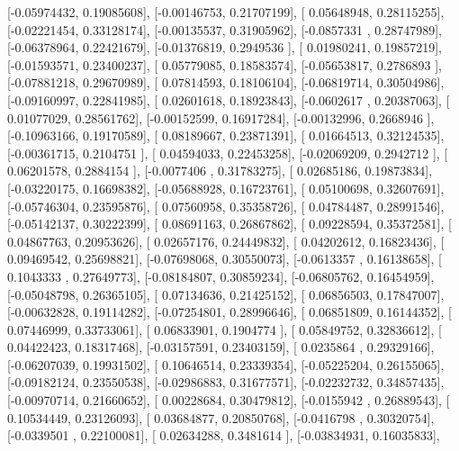 \documentclass{article}
\begin{document}
       [-0.05974432,  0.19085608],
       [-0.00146753,  0.21707199],
       [ 0.05648948,  0.28115255],
       [-0.02221454,  0.33128174],
       [-0.00135537,  0.31905962],
       [-0.0857331 ,  0.28747989],
       [-0.06378964,  0.22421679],
       [-0.01376819,  0.2949536 ],
       [ 0.01980241,  0.19857219],
       [-0.01593571,  0.23400237],
       [ 0.05779085,  0.18583574],
       [-0.05653817,  0.2786893 ],
       [-0.07881218,  0.29670989],
       [ 0.07814593,  0.18106104],
       [-0.06819714,  0.30504986],
       [-0.09160997,  0.22841985],
       [ 0.02601618,  0.18923843],
       [-0.0602617 ,  0.20387063],
       [ 0.01077029,  0.28561762],
       [-0.00152599,  0.16917284],
       [-0.00132996,  0.2668946 ],
       [-0.10963166,  0.19170589],
       [ 0.08189667,  0.23871391],
       [ 0.01664513,  0.32124535],
       [-0.00361715,  0.2104751 ],
       [ 0.04594033,  0.22453258],
       [-0.02069209,  0.2942712 ],
       [ 0.06201578,  0.2884154 ],
       [-0.0077406 ,  0.31783275],
       [ 0.02685186,  0.19873834],
       [-0.03220175,  0.16698382],
       [-0.05688928,  0.16723761],
       [ 0.05100698,  0.32607691],
       [-0.05746304,  0.23595876],
       [ 0.07560958,  0.35358726],
       [ 0.04784487,  0.28991546],
       [-0.05142137,  0.30222399],
       [ 0.08691163,  0.26867862],
       [ 0.09228594,  0.35372581],
       [ 0.04867763,  0.20953626],
       [ 0.02657176,  0.24449832],
       [ 0.04202612,  0.16823436],
       [ 0.09469542,  0.25698821],
       [-0.07698068,  0.30550073],
       [-0.0613357 ,  0.16138658],
       [ 0.1043333 ,  0.27649773],
       [-0.08184807,  0.30859234],
       [-0.06805762,  0.16454959],
       [-0.05048798,  0.26365105],
       [ 0.07134636,  0.21425152],
       [ 0.06856503,  0.17847007],
       [-0.00632828,  0.19114282],
       [-0.07254801,  0.28996646],
       [ 0.06851809,  0.16144352],
       [ 0.07446999,  0.33733061],
       [ 0.06833901,  0.1904774 ],
       [ 0.05849752,  0.32836612],
       [ 0.04422423,  0.18317468],
       [-0.03157591,  0.23403159],
       [ 0.0235864 ,  0.29329166],
       [-0.06207039,  0.19931502],
       [ 0.10646514,  0.23339354],
       [-0.05225204,  0.26155065],
       [-0.09182124,  0.23550538],
       [-0.02986883,  0.31677571],
       [-0.02232732,  0.34857435],
       [-0.00970714,  0.21660652],
       [ 0.00228684,  0.30479812],
       [-0.0155942 ,  0.26889543],
       [ 0.10534449,  0.23126093],
       [ 0.03684877,  0.20850768],
       [-0.0416798 ,  0.30320754],
       [-0.0339501 ,  0.22100081],
       [ 0.02634288,  0.3481614 ],
       [-0.03834931,  0.16035833],
\end{document}

